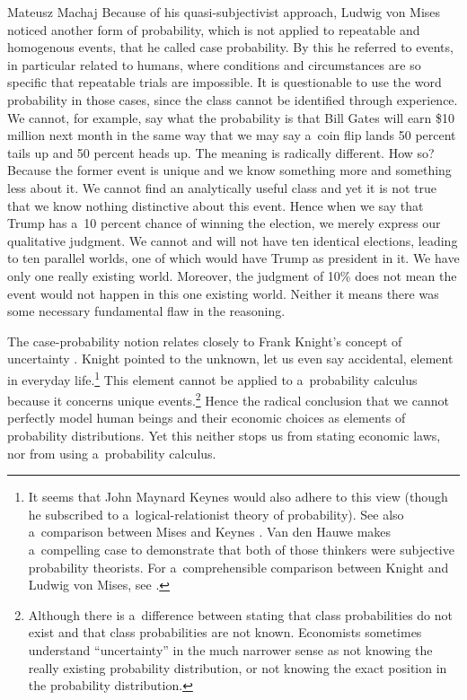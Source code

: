 \begin{artengenv}{Mateusz Machaj}
Because of his quasi-subjectivist approach, Ludwig von Mises noticed another form of probability, which is not applied to repeatable and homogenous events, that he called case probability. By this he referred to events, in particular related to humans, where conditions and circumstances are so specific that repeatable trials are impossible. It is questionable to use the word probability in those cases, since the class cannot be identified through experience. We cannot, for example, say what the probability is that Bill Gates will earn \$10 million next month in the same way that we may say a~coin flip lands 50 percent tails up and 50 percent heads up. The meaning is radically different. How so? Because the former event is unique and we know something more and something less about it. We cannot find an analytically useful class and yet it is not true that we know nothing distinctive about this event. Hence when we say that Trump has a~10 percent chance of winning the election, we merely express our qualitative judgment. We cannot and will not have ten identical elections, leading to ten parallel worlds, one of which would have Trump as president in it. We have only one really existing world. Moreover, the judgment of 10\% does not mean the event would not happen in this one existing world. Neither it means there was some necessary fundamental flaw in the reasoning.



The case-probability notion relates closely to Frank Knight's concept of uncertainty 
\parencite[][pp.226–232]{knight_risk_1971}. %
 Knight pointed to the unknown, let us even say accidental, element in everyday life.\footnote{It seems that John Maynard Keynes 
\parencite*[][]{keynes_treatise_1921} %
 would also adhere to this view (though he subscribed to a~logical-relationist theory of probability). See also a~comparison between Mises and Keynes 
\parencite[][]{hauwe_john_2007}. %
 Van den Hauwe makes a~compelling case to demonstrate that both of those thinkers were subjective probability theorists. For a~comprehensible comparison between Knight and Ludwig von Mises, see 
\parencite[][]{hoppe_limits_2007}.%
} This element cannot be applied to a~probability calculus because it concerns unique events.\footnote{Although there is a~difference between stating that class probabilities do not exist and that class probabilities are not known. Economists sometimes understand ``uncertainty'' in the much narrower sense as not knowing the really existing probability distribution, or not knowing the exact position in the probability distribution.} Hence the radical conclusion that we cannot perfectly model human beings and their economic choices as elements of probability distributions. Yet this neither stops us from stating economic laws, nor from using a~probability calculus.




\end{artengenv}
